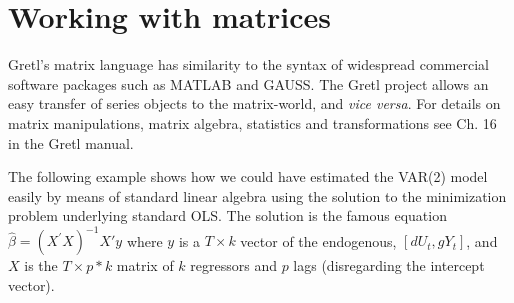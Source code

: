 \documentclass[11pt]{article}
\begin{document}
%


\section{Working with matrices}
Gretl's matrix language has similarity to the syntax of widespread commercial software packages such as MATLAB and GAUSS. The Gretl project allows an easy transfer of series objects to the matrix-world, and \textit{vice versa}. For details on matrix manipulations, matrix algebra, statistics and transformations see Ch. 16 in the Gretl manual.

The following example shows how we could have estimated the VAR(2) model easily by means of standard linear algebra using the solution to the minimization problem underlying standard OLS. The solution is the famous equation $ \hat \beta = (X^\prime X)^{-1} X'y $ where $ y $  is a $ T \times k $ vector of the endogenous, $ [dU_t, gY_t] $, and $ X $ is the $ T \times p*k $ matrix of $ k $ regressors and $ p $ lags (disregarding the intercept vector).
\end{document}

